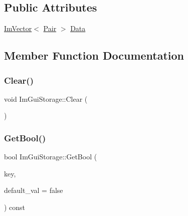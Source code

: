 \subsection*{Public Attributes}
\begin{DoxyCompactItemize}
\item 
\hyperlink{class_im_vector}{Im\+Vector}$<$ \hyperlink{struct_im_gui_storage_1_1_pair}{Pair} $>$ \hyperlink{struct_im_gui_storage_aab0b9789fac598a34c500459259fde42}{Data}
\end{DoxyCompactItemize}


\subsection{Member Function Documentation}
\hypertarget{struct_im_gui_storage_a72ceecfbca3d08df8c2a232b77890c20}{}\label{struct_im_gui_storage_a72ceecfbca3d08df8c2a232b77890c20} 
\subsubsection{\texorpdfstring{Clear()}{Clear()}}
{\footnotesize\ttfamily void Im\+Gui\+Storage\+::\+Clear (\begin{DoxyParamCaption}{ }\end{DoxyParamCaption})}

\hypertarget{struct_im_gui_storage_a22d34ae6278f86468a3e7df8fbd1b632}{}\label{struct_im_gui_storage_a22d34ae6278f86468a3e7df8fbd1b632} 
\subsubsection{\texorpdfstring{Get\+Bool()}{GetBool()}}
{\footnotesize\ttfamily bool Im\+Gui\+Storage\+::\+Get\+Bool (\begin{DoxyParamCaption}\item[{Im\+Gui\+ID}]{key,  }\item[{bool}]{default\+\_\+val = {\ttfamily false} }\end{DoxyParamCaption}) const}

\hypertarget{struct_im_gui_storage_aeb0d62100453d710bac5f6ad0a6e6a2e}{}\label{struct_im_gui_storage_aeb0d62100453d710bac5f6ad0a6e6a2e} 
